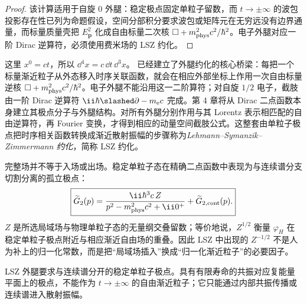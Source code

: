 \begin{proof}
该计算适用于自旋 $0$ 外腿：稳定极点固定单粒子留数，而 $t\to\pm\infty$ 的波包投影存在性已列为命题假设，空间分部积分要求波包或矩阵元在无穷远没有边界通量，而标量质量壳把 $E_{\mathbf p}^2$ 化成自由标量二次核 $\Box+m_{\rm phys}^2c^2/\hbar^2$。电子外腿对应一阶 Dirac 逆算符，必须使用费米场的 LSZ 约化。
\end{proof}
这里 $x^0=ct$，所以 $\dd^4 x=c\,\dd t\,\dd^3 x$。 已经建立了外腿约化的核心桥梁：每把一个标量渐近粒子从外态移入时序关联函数，就会在相应外部坐标上作用一次自由标量逆核 $\Box+m_{\rm phys}^2c^2/\hbar^2$。电子外腿不能沿用这一二阶算符；对自旋 $1/2$ 电子，截肢由一阶 Dirac 逆算符 $\ii\hbar\slashed\partial-m_{\mathrm e} c$ 完成。第 4 章将从 Dirac 二点函数本身建立其极点分子与外腿结构。对所有外腿分别作用与其 Lorentz 表示相匹配的自由逆算符，再 Fourier 变换，才得到相应的动量空间截肢公式。这整套由单粒子极点把时序相关函数转换成渐近散射振幅的步骤称为\emph{Lehmann--Symanzik--Zimmermann 约化}，简称 LSZ 约化。

完整场并不等于入场或出场。稳定单粒子态在精确二点函数中表现为与连续谱分支切割分离的孤立极点：
\begin{equation}
 \boxed{
 \widetilde G_2(p)
 =\frac{\ii\hbar^3c\,Z}{p^2-m_{\rm phys}^2c^2+\ii0^+}
 +\widetilde G_{2,\rm cont}(p).}
 \label{eq:lsz-pole-plus-cont-r7}
\end{equation}
$Z$ 是所选局域场与物理单粒子态的无量纲交叠留数；等价地说，$Z^{1/2}$ 衡量 $\varphi_H$ 在稳定单粒子极点附近与相应渐近自由场的重叠。因此 LSZ 中出现的 $Z^{-1/2}$ 不是人为补上的归一化常数，而是把“局域场插入”换成“归一化渐近粒子”的必要因子。

LSZ 外腿要求与连续谱分开的稳定单粒子极点。具有有限寿命的共振对应复能量平面上的极点，不能作为 $t\to\pm\infty$ 的自由渐近粒子；它只能通过内部共振传播或连续谱进入散射振幅。

